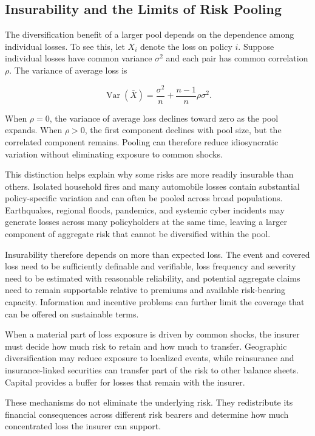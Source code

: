 \subsection{Insurability and the Limits of Risk Pooling}

The diversification benefit of a larger pool depends on the dependence among individual losses. To see this, let $X_i$ denote the loss on policy $i$. Suppose individual losses have common variance $\sigma^2$ and each pair has common correlation $\rho$. The variance of average loss is

\begin{equation}
\operatorname{Var}(\bar{X})=
\frac{\sigma^2}{n}
+
\frac{n-1}{n}\rho\sigma^2.
\label{eq:ch15-correlated-pooling}
\end{equation}

When $\rho=0$, the variance of average loss declines toward zero as the pool expands. When $\rho>0$, the first component declines with pool size, but the correlated component remains. Pooling can therefore reduce idiosyncratic variation without eliminating exposure to common shocks.

This distinction helps explain why some risks are more readily insurable than others. Isolated household fires and many automobile losses contain substantial policy-specific variation and can often be pooled across broad populations. Earthquakes, regional floods, pandemics, and systemic cyber incidents may generate losses across many policyholders at the same time, leaving a larger component of aggregate risk that cannot be diversified within the pool.

Insurability therefore depends on more than expected loss. The event and covered loss need to be sufficiently definable and verifiable, loss frequency and severity need to be estimated with reasonable reliability, and potential aggregate claims need to remain supportable relative to premiums and available risk-bearing capacity. Information and incentive problems can further limit the coverage that can be offered on sustainable terms.

\begin{tcolorbox}[
enhanced,
breakable,
colback=white,
colframe=FinanceBlue,
boxrule=0.7pt,
sharp corners,
borderline west={2.2pt}{0pt}{FinanceBlue},
title=\textbf{Financial Perspective: When Pooling Is Not Enough},
coltitle=white,
colbacktitle=FinanceBlue,
fonttitle=\bfseries,
before skip=1.2em,
after skip=1.2em
]

When a material part of loss exposure is driven by common shocks, the insurer must decide how much risk to retain and how much to transfer. Geographic diversification may reduce exposure to localized events, while reinsurance and insurance-linked securities can transfer part of the risk to other balance sheets. Capital provides a buffer for losses that remain with the insurer.

These mechanisms do not eliminate the underlying risk. They redistribute its financial consequences across different risk bearers and determine how much concentrated loss the insurer can support.

\end{tcolorbox}



